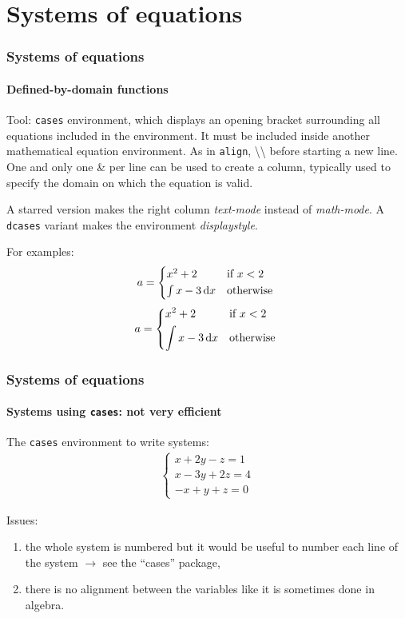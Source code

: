 \documentclass[11pt]{beamer}
\begin{document}
\section{Systems of equations}

\begin{frame}
	\frametitle{Systems of equations}
	\framesubtitle{Defined-by-domain functions}
	
	Tool: \texttt{cases} environment, which displays an opening bracket surrounding all equations included in the environment.
	It must be included inside another mathematical equation environment.
	As in \texttt{align}, \textbackslash\textbackslash{} before starting a new line.
	One and only one \& per line can be used to create a column, typically used to specify the domain on which the equation is valid.
	
	A starred version makes the right column \emph{text-mode} instead of \emph{math-mode}.
	A \texttt{dcases} variant makes the environment \emph{displaystyle}.
	
	For examples:
	\begin{equation}
		a = \begin{cases*}
			x^2 + 2					& if  $x<2$  \\
			\int x-3\, \mathrm{d}x	& otherwise
		\end{cases*}
	\end{equation}
	\begin{equation}
		a = \begin{dcases*}
			x^2 + 2					& if  $x<2$  \\
			\int x-3\, \mathrm{d}x	& otherwise
		\end{dcases*}
	\end{equation}
\end{frame}

\begin{frame}
	\frametitle{Systems of equations}
	\framesubtitle{Systems using \texttt{cases}: not very efficient}
	
	The \texttt{cases} environment to write systems:
	\begin{align}
		\begin{cases}
			x  +2y - z  = 1 \\
			x  -3y + 2z = 4 \\
			-x +y  +z   = 0 
		\end{cases}
	\end{align}
	
	Issues:
	\begin{enumerate}
		\item the whole system is numbered but it would be useful to number each line of the system $\rightarrow$ see the \enquote{cases} package,
		\item there is no alignment between the variables like it is sometimes done in algebra.
	\end{enumerate}
\end{frame}
\end{document}
